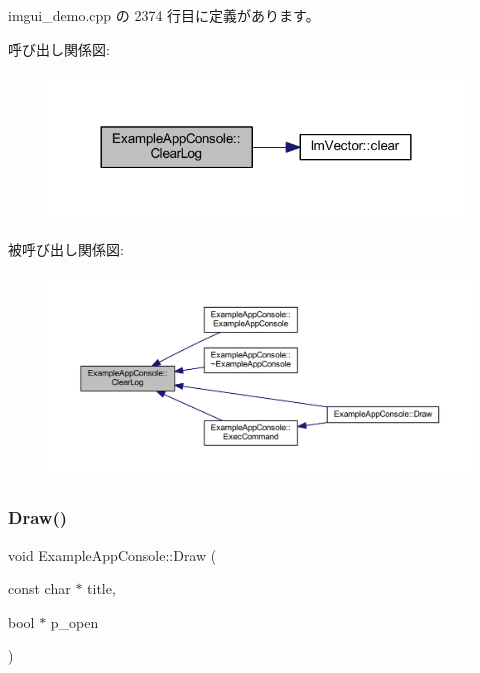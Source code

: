  imgui\+\_\+demo.\+cpp の 2374 行目に定義があります。

呼び出し関係図\+:\nopagebreak
\begin{figure}[H]
\begin{center}
\leavevmode
\includegraphics[width=312pt]{struct_example_app_console_a2ef13f00c474b16b8da2ec062d5e5cc2_cgraph}
\end{center}
\end{figure}
被呼び出し関係図\+:\nopagebreak
\begin{figure}[H]
\begin{center}
\leavevmode
\includegraphics[width=350pt]{struct_example_app_console_a2ef13f00c474b16b8da2ec062d5e5cc2_icgraph}
\end{center}
\end{figure}
\mbox{\label{struct_example_app_console_a0518a09c7e8648dd52c7c06df19ac17a}} 
\subsubsection{\texorpdfstring{Draw()}{Draw()}}
{\footnotesize\ttfamily void Example\+App\+Console\+::\+Draw (\begin{DoxyParamCaption}\item[{const char $\ast$}]{title,  }\item[{bool $\ast$}]{p\+\_\+open }\end{DoxyParamCaption})\hspace{0.3cm}{\ttfamily [inline]}}



